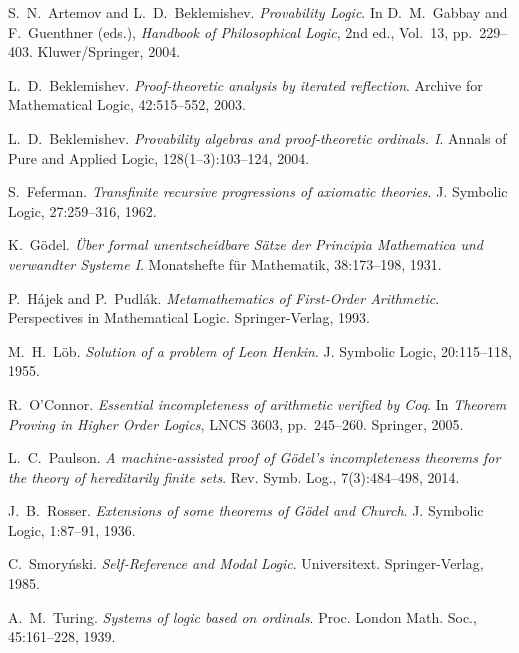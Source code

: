 \documentclass[11pt]{article}
\begin{document}
\begin{thebibliography}{10}

S.~N.~Artemov and L.~D.~Beklemishev.
\emph{Provability Logic}.
In D.~M.~Gabbay and F.~Guenthner (eds.), \emph{Handbook of Philosophical Logic}, 2nd ed., Vol.~13, pp.~229--403.
Kluwer/Springer, 2004.

L.~D.~Beklemishev.
\emph{Proof-theoretic analysis by iterated reflection}.
Archive for Mathematical Logic, 42:515--552, 2003.

L.~D.~Beklemishev.
\emph{Provability algebras and proof-theoretic ordinals. I}.
Annals of Pure and Applied Logic, 128(1--3):103--124, 2004.

S.~Feferman.
\emph{Transfinite recursive progressions of axiomatic theories}.
J. Symbolic Logic, 27:259--316, 1962.

K.~Gödel.
\emph{Über formal unentscheidbare Sätze der Principia Mathematica und verwandter Systeme I}.
Monatshefte für Mathematik, 38:173--198, 1931.

P.~Hájek and P.~Pudlák.
\emph{Metamathematics of First-Order Arithmetic}.
Perspectives in Mathematical Logic. Springer-Verlag, 1993.

M.~H.~Löb.
\emph{Solution of a problem of Leon Henkin}.
J. Symbolic Logic, 20:115--118, 1955.

R.~O'Connor.
\emph{Essential incompleteness of arithmetic verified by Coq}.
In \emph{Theorem Proving in Higher Order Logics}, LNCS 3603, pp.~245--260. Springer, 2005.

L.~C.~Paulson.
\emph{A machine-assisted proof of Gödel's incompleteness theorems for the theory of hereditarily finite sets}.
Rev. Symb. Log., 7(3):484--498, 2014.

J.~B.~Rosser.
\emph{Extensions of some theorems of Gödel and Church}.
J. Symbolic Logic, 1:87--91, 1936.

C.~Smoryński.
\emph{Self-Reference and Modal Logic}.
Universitext. Springer-Verlag, 1985.

A.~M.~Turing.
\emph{Systems of logic based on ordinals}.
Proc. London Math. Soc., 45:161--228, 1939.

\end{thebibliography}
\end{document}
